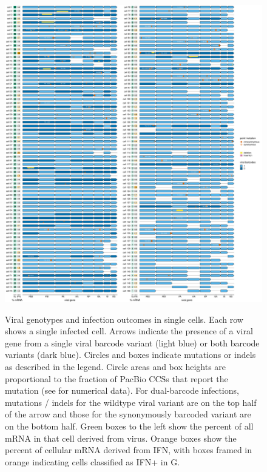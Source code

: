 \documentclass[9pt,lineno]{elife}
\begin{document}
\begin{figure}
\begin{fullwidth}
{\centering
\includegraphics[height=0.76\textheight]{figures/single_cell_figures/p_genotypes.pdf}
}
\caption{
Viral genotypes and infection outcomes in single cells.
Each row shows a single infected cell.
Arrows indicate the presence of a viral gene from a single viral barcode variant (light blue) or both barcode variants (dark blue).
Circles and boxes indicate mutations or indels as described in the legend.
Circle areas and box heights are proportional to the fraction of PacBio CCSs that report the mutation (see  for numerical data).
For dual-barcode infections, mutations / indels for the wildtype viral variant are on the top half of the arrow and those for the synonymously barcoded variant are on the bottom half. 
Green boxes to the left show the percent of all mRNA in that cell derived from virus.
Orange boxes show the percent of cellular mRNA derived from IFN, with boxes framed in orange indicating cells classified as IFN+ in G.
}
\label{fig:genotypes}


\end{fullwidth}
\end{figure}
\end{document}
